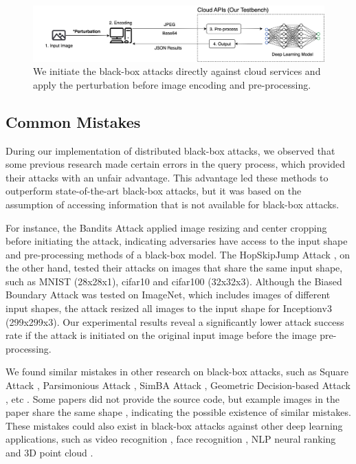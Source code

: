 \begin{figure}[tbp]
    \centering
    \includegraphics[width=\linewidth]{figures/chapter_classification/cloudapi.jpg}
    \caption{We initiate the black-box attacks directly against cloud services and apply the perturbation before image encoding and pre-processing.}
    \label{fig:cloudapi}
\end{figure}

\subsection{Common Mistakes}
\label{common_errors}

During our implementation of distributed black-box attacks, we observed that some previous research made certain errors in the query process, which provided their attacks with an unfair advantage. This advantage led these methods to outperform state-of-the-art black-box attacks, but it was based on the assumption of accessing information that is not available for black-box attacks. 

For instance, the Bandits Attack \citep{ilyas2018black, ilyas2018prior} applied image resizing and center cropping before initiating the attack, indicating adversaries have access to the input shape and pre-processing methods of a black-box model. The HopSkipJump Attack \citep{chen2020hopskipjumpattack}, on the other hand, tested their attacks on images that share the same input shape, such as MNIST (28x28x1), cifar10 and cifar100 (32x32x3). Although the Biased Boundary Attack \citep{Brunner_2019} was tested on ImageNet, which includes images of different input shapes, the attack resized all images to the input shape for Inceptionv3 (299x299x3). Our experimental results reveal a significantly lower attack success rate if the attack is initiated on the original input image before the image pre-processing.

We found similar mistakes in other research on black-box attacks, such as Square Attack \citep{andriushchenko2020square}, Parsimonious Attack \citep{moon2019parsimonious}, SimBA Attack \citep{guo2019simple}, Geometric Decision-based Attack \citep{rahmati2020geoda}, etc \citep{cheng2018query, cheng2019sign, chen2020rays, debenedetti2023evading}. Some papers did not provide the source code, but example images in the paper share the same shape \citep{chen2023query, bai2023query, xu2023sparse, wu2023black}, indicating the possible existence of similar mistakes. These mistakes could also exist in black-box attacks against other deep learning applications, such as video recognition \citep{jiang2019black, chen2023coreset, mu2024enhancing}, face recognition \citep{dong2019efficient, ma2023transferable}, NLP neural ranking \citep{wu2023prada, liu2022order} and 3D point cloud \citep{liu2022imperceptible, zhang20233d, tao20233dhacker}.

